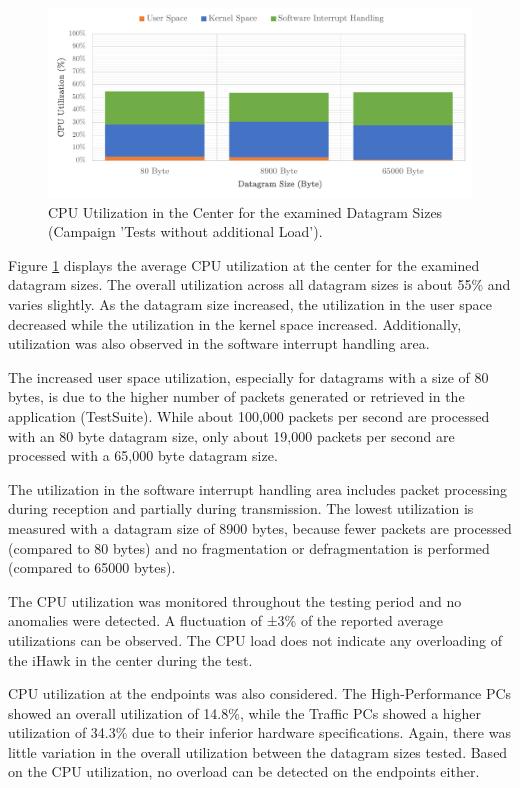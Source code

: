 \begin{figure}[h!]
    \centering
    \includegraphics[width=1\linewidth]{figures/reliability/ihawk/diagr2.pdf}
    \caption{CPU Utilization in the Center for the examined Datagram Sizes (Campaign 'Tests without additional Load').}
    \label{fig:diagr2CPU}
\end{figure}

Figure \ref{fig:diagr2CPU} displays the average CPU utilization at the center for the examined datagram sizes. The overall utilization across all datagram sizes is about 55\% and varies slightly. As the datagram size increased, the utilization in the user space decreased while the utilization in the kernel space increased. Additionally, utilization was also observed in the software interrupt handling area.

The increased user space utilization, especially for datagrams with a size of 80 bytes, is due to the higher number of packets generated or retrieved in the application (TestSuite). While about 100,000 packets per second are processed with an 80 byte datagram size, only about 19,000 packets per second are processed with a 65,000 byte datagram size.

The utilization in the software interrupt handling area includes packet processing during reception and partially during transmission. The lowest utilization is measured with a datagram size of 8900 bytes, because fewer packets are processed (compared to 80 bytes) and no fragmentation or defragmentation is performed (compared to 65000 bytes).

The CPU utilization was monitored throughout the testing period and no anomalies were detected. A fluctuation of ±3\% of the reported average utilizations can be observed. The CPU load does not indicate any overloading of the iHawk in the center during the test.

CPU utilization at the endpoints was also considered. The High-Performance PCs showed an overall utilization of 14.8\%, while the Traffic PCs showed a higher utilization of 34.3\% due to their inferior hardware specifications. Again, there was little variation in the overall utilization between the datagram sizes tested. Based on the CPU utilization, no overload can be detected on the endpoints either.

